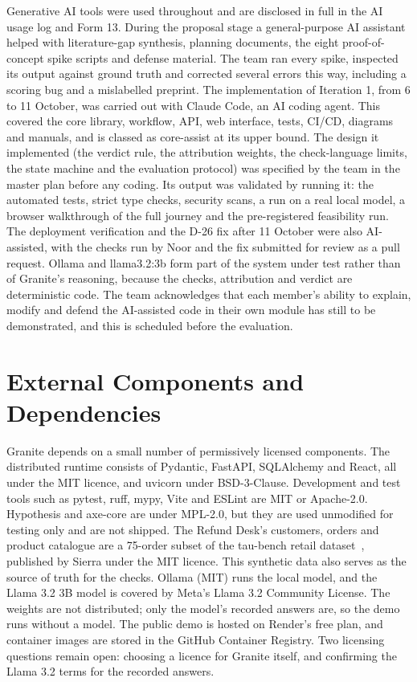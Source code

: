 \documentclass{fast-nuces-bs}
\begin{document}
Generative AI tools were used throughout and are disclosed in full in the AI usage log and Form 13. During the proposal stage a general-purpose AI assistant helped with literature-gap synthesis, planning documents, the eight proof-of-concept spike scripts and defense material. The team ran every spike, inspected its output against ground truth and corrected several errors this way, including a scoring bug and a mislabelled preprint. The implementation of Iteration 1, from 6 to 11 October, was carried out with Claude Code, an AI coding agent. This covered the core library, workflow, API, web interface, tests, CI/CD, diagrams and manuals, and is classed as core-assist at its upper bound. The design it implemented (the verdict rule, the attribution weights, the check-language limits, the state machine and the evaluation protocol) was specified by the team in the master plan before any coding. Its output was validated by running it: the automated tests, strict type checks, security scans, a run on a real local model, a browser walkthrough of the full journey and the pre-registered feasibility run. The deployment verification and the D-26 fix after 11 October were also AI-assisted, with the checks run by Noor and the fix submitted for review as a pull request. Ollama and llama3.2:3b form part of the system under test rather than of Granite's reasoning, because the checks, attribution and verdict are deterministic code. The team acknowledges that each member's ability to explain, modify and defend the AI-assisted code in their own module has still to be demonstrated, and this is scheduled before the evaluation.

\section{External Components and Dependencies}

Granite depends on a small number of permissively licensed components. The distributed runtime consists of Pydantic, FastAPI, SQLAlchemy and React, all under the MIT licence, and uvicorn under BSD-3-Clause. Development and test tools such as pytest, ruff, mypy, Vite and ESLint are MIT or Apache-2.0. Hypothesis and axe-core are under MPL-2.0, but they are used unmodified for testing only and are not shipped. The Refund Desk's customers, orders and product catalogue are a 75-order subset of the tau-bench retail dataset~\cite{taubench}, published by Sierra under the MIT licence. This synthetic data also serves as the source of truth for the checks. Ollama (MIT) runs the local model, and the Llama 3.2 3B model is covered by Meta's Llama 3.2 Community License. The weights are not distributed; only the model's recorded answers are, so the demo runs without a model. The public demo is hosted on Render's free plan, and container images are stored in the GitHub Container Registry. Two licensing questions remain open: choosing a licence for Granite itself, and confirming the Llama 3.2 terms for the recorded answers.
\end{document}
